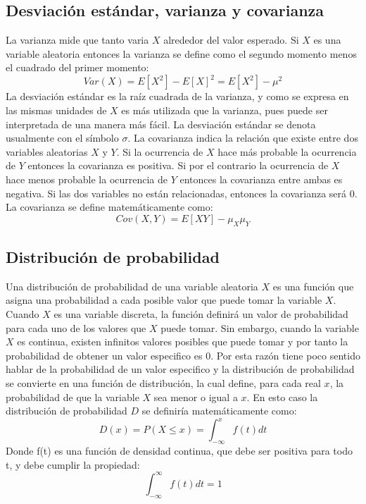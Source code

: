\documentclass[a4paper, 11pt, oneside]{report}
\begin{document}
\subsection{Desviación estándar, varianza y covarianza}
La varianza mide que tanto varia $X$ alrededor del valor esperado. Si $X$ es una variable aleatoria entonces la varianza se define como el segundo momento menos el cuadrado del primer momento:
\[Var(X) = E[X^2] - E[X]^2 = E[X^2] - \mu^2\]
La desviación estándar es la raíz cuadrada de la varianza, y como se expresa en las mismas unidades de $X$ es más utilizada que la varianza, pues puede ser interpretada de una manera más fácil. La desviación estándar se denota usualmente con el símbolo $\sigma$.
La covarianza indica la relación que existe entre dos variables aleatorias $X$ y $Y$. Si la ocurrencia de $X$ hace más probable la ocurrencia de $Y$ entonces la covarianza es positiva. Si por el contrario la ocurrencia de $X$ hace menos probable la ocurrencia de $Y$ entonces la covarianza entre ambas es negativa. Si las dos variables no están relacionadas, entonces la covarianza será 0. La covarianza se define matemáticamente como:
\[Cov(X, Y) = E[XY] - \mu_X\mu_Y\]
\subsection{Distribución de probabilidad}
Una distribución de probabilidad de una variable aleatoria $X$ es una función que asigna una probabilidad a cada posible valor que puede tomar la variable $X$. Cuando $X$ es una variable discreta, la función definirá un valor de probabilidad para cada uno de los valores que $X$ puede tomar. Sin embargo, cuando la variable $X$ es continua, existen infinitos valores posibles que puede tomar y por tanto la probabilidad de obtener un valor especifico es 0. Por esta razón tiene poco sentido hablar de la probabilidad de un valor especifico y la distribución de probabilidad se convierte en una función de distribución, la cual define, para cada real $x$, la probabilidad de que la variable $X$ sea menor o igual a $x$. En esto caso la distribución de probabilidad $D$ se definiría matemáticamente como:
\[D(x) = P(X \leq x) = \int_{-\infty}^x{f(t)dt}\]
Donde f(t) es una función de densidad continua, que debe ser positiva para todo t, y debe cumplir la propiedad:
\[\int_{-\infty}^{\infty}{f(t)dt} = 1\]
\end{document}
